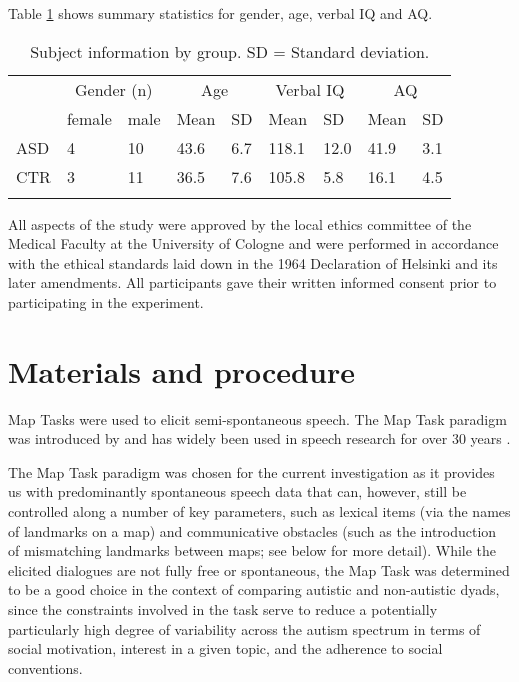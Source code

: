 Table \ref{tab:SubjectTable} shows summary statistics for gender, age, verbal IQ and AQ.



\begin{table}

\begin{center}
		\caption{\label{tab:SubjectTable}Subject information by group. SD = Standard deviation.}
		
		\begin{tabular}{lllllllll}
			\lsptoprule
			& \multicolumn{2}{c}{Gender (n)} & \multicolumn{2}{c}{Age} & \multicolumn{2}{c}{Verbal IQ} & \multicolumn{2}{c}{AQ} \\
			\cmidrule(r){2-3} \cmidrule(r){4-5} \cmidrule(r){6-7} \cmidrule(r){8-9}
			& female & male & Mean & SD & Mean & SD & Mean & SD\\
			\midrule
			ASD & 4 & 10 & 43.6 & 6.7 & 118.1 & 12.0 & 41.9 & 3.1\\
			CTR & 3 & 11 & 36.5 & 7.6 & 105.8 & 5.8 & 16.1 & 4.5\\
			\lspbottomrule
		\end{tabular}
\end{center}

\end{table}

All aspects of the study were approved by the local ethics committee of the Medical Faculty at the University of Cologne and were performed in accordance with the ethical standards laid down in the 1964 Declaration of Helsinki and its later amendments. All participants gave their written informed consent prior to participating in the experiment.


\section{Materials and procedure}\label{materials}

Map Tasks were used to elicit semi-spontaneous speech. The Map Task paradigm was introduced by \citet{andersonTeachingTalkStrategies1984} and has widely been used in speech research for over 30 years \citep[for an influential article describing a corpus of Map Task speech see][]{andersonHCRCMapTask1991}.

The Map Task paradigm was chosen for the current investigation as it provides us with predominantly spontaneous speech data that can, however, still be controlled along a number of key parameters, such as lexical items (via the names of landmarks on a map) and communicative obstacles (such as the introduction of mismatching landmarks between maps; see below for more detail). While the elicited dialogues are not fully free or spontaneous, the Map Task was determined to be a good choice in the context of comparing autistic and non-autistic dyads, since the constraints involved in the task serve to reduce a potentially particularly high degree of variability across the autism spectrum in terms of social motivation, interest in a given topic, and the adherence to social conventions.

